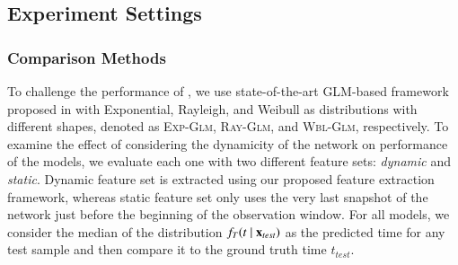 \subsection{Experiment Settings}
\subsubsection{Comparison Methods}
To challenge the performance of \npglm, we use state-of-the-art GLM-based framework proposed in \cite{sun2012will} with Exponential, Rayleigh, and Weibull as distributions with different shapes, denoted as \textsc{Exp-Glm}, \textsc{Ray-Glm}, and \textsc{Wbl-Glm}, respectively. To examine the effect of considering the dynamicity of the network on performance of the models, we evaluate each one with two different feature sets: \emph{dynamic} and \emph{static}. Dynamic feature set is extracted using our proposed feature extraction framework, whereas static feature set only uses the very last snapshot of the network just before the beginning of the observation window. For all models, we consider the median of the distribution $f_T(t\mid\mathbf{x}_{test})$ as the predicted time for any test sample and then compare it to the ground truth time $t_{test}$.
